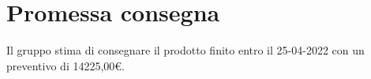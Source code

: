 \section{Promessa consegna}\label{section:promessa_consegna}

Il gruppo stima di consegnare il prodotto finito entro il 25-04-2022 con un preventivo di 14225,00€.
